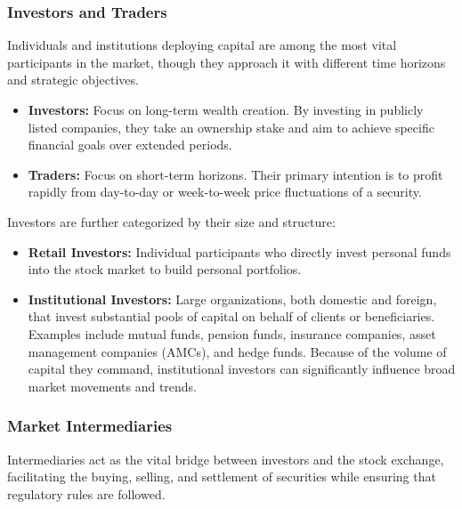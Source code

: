 \documentclass[12pt,openany]{book}
\begin{document}
\subsubsection{Investors and Traders}
Individuals and institutions deploying capital are among the most vital participants in the market, though they approach it with different time horizons and strategic objectives.

\begin{itemize}[leftmargin=*]
    \item \textbf{Investors:} Focus on long-term wealth creation. By investing in publicly listed companies, they take an ownership stake and aim to achieve specific financial goals over extended periods.
    \item \textbf{Traders:} Focus on short-term horizons. Their primary intention is to profit rapidly from day-to-day or week-to-week price fluctuations of a security.
\end{itemize}

Investors are further categorized by their size and structure:

\begin{itemize}[leftmargin=*]
    \item \textbf{Retail Investors:} Individual participants who directly invest personal funds into the stock market to build personal portfolios.
    \item \textbf{Institutional Investors:} Large organizations, both domestic and foreign, that invest substantial pools of capital on behalf of clients or beneficiaries. Examples include mutual funds, pension funds, insurance companies, asset management companies (AMCs), and hedge funds. Because of the volume of capital they command, institutional investors can significantly influence broad market movements and trends.
\end{itemize}

\subsubsection{Market Intermediaries}
Intermediaries act as the vital bridge between investors and the stock exchange, facilitating the buying, selling, and settlement of securities while ensuring that regulatory rules are followed.
\end{document}
